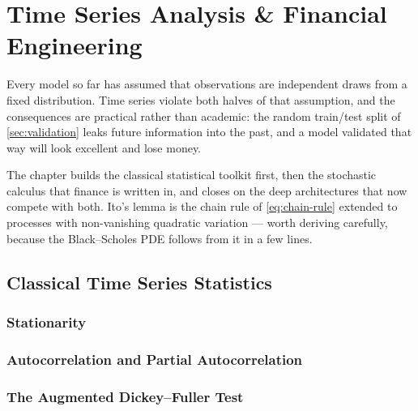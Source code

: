 %
\chapter{Time Series Analysis \& Financial Engineering}
\label{ch:time-series}

Every model so far has assumed that observations are independent draws from a
fixed distribution. Time series violate both halves of that assumption, and the
consequences are practical rather than academic: the random train/test split of
\cref{sec:validation} leaks future information into the past, and a model
validated that way will look excellent and lose money.

The chapter builds the classical statistical toolkit first, then the stochastic
calculus that finance is written in, and closes on the deep architectures that
now compete with both. Ito's lemma is the chain rule of
\cref{eq:chain-rule} extended to processes with non-vanishing quadratic
variation --- worth deriving carefully, because the Black--Scholes PDE follows
from it in a few lines.

\section{Classical Time Series Statistics}
\label{sec:classical-time-series}

\subsection{Stationarity}

\subsection{Autocorrelation and Partial Autocorrelation}

\subsection{The Augmented Dickey--Fuller Test}

